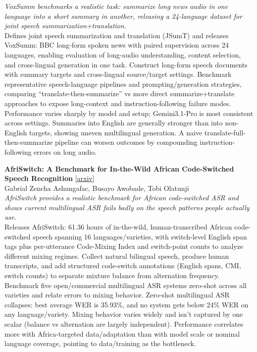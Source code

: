 \documentclass[12pt,letterpaper]{article}
\begin{document}
{\small\textit{VoxSumm benchmarks a realistic task: summarize long news audio in one language into a short summary in another, releasing a 24-language dataset for joint speech summarization+translation.}}\\[1pt]
{\footnotesize Defines joint speech summarization and translation (JSumT) and releases VoxSumm: BBC long-form spoken news with paired supervision across 24 languages, enabling evaluation of long-audio understanding, content selection, and cross-lingual generation in one task. Construct long-form speech documents with summary targets and cross-lingual source/target settings. Benchmark representative speech-language pipelines and prompting/generation strategies, comparing ``translate-then-summarize'' vs more direct summarize+translate approaches to expose long-context and instruction-following failure modes. Performance varies sharply by model and setup; Gemini3.1-Pro is most consistent across settings. Summaries into English are generally stronger than into non-English targets, showing uneven multilingual generation. A naive translate-full-then-summarize pipeline can worsen outcomes by compounding instruction-following errors on long audio.}

\medskip

{\small\textbf{AfriSwitch: A Benchmark for In-the-Wild African Code-Switched Speech Recognition}} {\scriptsize[\href{https://arxiv.org/abs/2608.26434}{arxiv}]}\\
{\scriptsize Gabrial Zencha Ashungafac, Busayo Awobade, Tobi Olatunji}\\

{\small\textit{AfriSwitch provides a realistic benchmark for African code-switched ASR and shows current multilingual ASR fails badly on the speech patterns people actually use.}}\\[1pt]
{\footnotesize Releases AfriSwitch: 61.36 hours of in-the-wild, human-transcribed African code-switched speech spanning 16 languages/varieties, with switch-level English span tags plus per-utterance Code-Mixing Index and switch-point counts to analyze different mixing regimes. Collect natural bilingual speech, produce human transcripts, and add structured code-switch annotations (English spans, CMI, switch counts) to separate mixture balance from alternation frequency. Benchmark five open/commercial multilingual ASR systems zero-shot across all varieties and relate errors to mixing behavior. Zero-shot multilingual ASR collapses: best average WER is 35.93\%, and no system gets below 24\% WER on any language/variety. Mixing behavior varies widely and isn't captured by one scalar (balance vs alternation are largely independent). Performance correlates more with Africa-targeted data/adaptation than with model scale or nominal language coverage, pointing to data/training as the bottleneck.}
\end{document}
